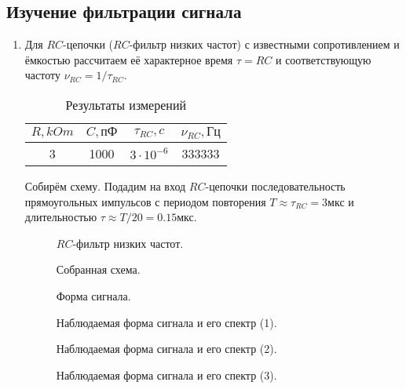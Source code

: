 \documentclass[a4paper,12pt]{article} %
\begin{document}
\subsection{Изучение фильтрации сигнала}

\begin{enumerate}
    \item Для $RC$-цепочки ($RC$-фильтр низких частот) с известными сопротивлением и ёмкостью рассчитаем её характерное время $\tau = RC$ и соответствующую частоту $\nu_{RC} = 1/{\tau_{RC}}$.

    \begin{table}[h]
	\centering
		\begin{tabular}{|c|c|c|c|}
			\hline
                $R, kOm$ & $C, пФ$ & $\tau_{RC}, c$ &$\nu_{RC}, Гц$ \\ \hline
                3 & 1000 & $3 \cdot 10^{-6}$ & 333333 \\ \hline
		\end{tabular}
	\caption{Результаты измерений}
        \label{tab6}
    \end{table}

    Собирём схему. Подадим на вход $RC$-цепочки последовательность прямоугольных импульсов с периодом повторения $ T \approx \tau_{RC} = 3 \text{мкс}$ и длительностью $\tau \approx T/20 = 0.15 \text{мкс}$.

    \begin{figure}[h]
        \begin{minipage}[h]{0.5\linewidth}
            \caption{$RC$-фильтр низких частот.}
            \label{f20}
        \end{minipage}
        \begin{minipage}[h]{0.5\linewidth}
            \caption{Собранная схема.}
            \label{f21}
        \end{minipage}
        \begin{minipage}[h]{0.5\linewidth}
            \caption{Форма сигнала.}
            \label{f22}
        \end{minipage}
        \begin{minipage}[h]{0.5\linewidth}
            \caption{Наблюдаемая форма сигнала и его спектр (1).}
            \label{f23}
        \end{minipage}
        \begin{minipage}[h]{0.5\linewidth}
            \caption{Наблюдаемая форма сигнала и его спектр (2).}
            \label{f24}
        \end{minipage}
        \begin{minipage}[h]{0.5\linewidth}
            \caption{Наблюдаемая форма сигнала и его спектр (3).}
            \label{f25}
        \end{minipage}
    \end{figure}


\end{enumerate}
\end{document}
